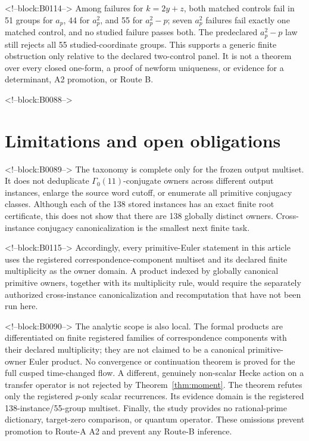 \documentclass[11pt]{article}
\theoremstyle{definition}
\theoremstyle{remark}
\newcommand{\G}{\Gamma_0(11)}
\begin{document}
<!--block:B0114-->
Among failures for $k=2y+z$, both matched controls fail in 51 groups for $a_p$, 44 for $a_p^2$, and 55 for $a_p^2-p$; seven $a_p^2$ failures fail exactly one matched control, and no studied failure passes both. The predeclared $a_p^2-p$ law still rejects all 55 studied-coordinate groups. This supports a generic finite obstruction only relative to the declared two-control panel. It is not a theorem over every closed one-form, a proof of newform uniqueness, or evidence for a determinant, A2 promotion, or Route B.

<!--block:B0088-->
\section{Limitations and open obligations}

<!--block:B0089-->
The taxonomy is complete only for the frozen output multiset. It does not deduplicate $\G$-conjugate owners across different output instances, enlarge the source word cutoff, or enumerate all primitive conjugacy classes. Although each of the 138 stored instances has an exact finite root certificate, this does not show that there are 138 globally distinct owners. Cross-instance conjugacy canonicalization is the smallest next finite task.

<!--block:B0115-->
Accordingly, every primitive-Euler statement in this article uses the registered correspondence-component multiset and its declared finite multiplicity as the owner domain. A product indexed by globally canonical primitive owners, together with its multiplicity rule, would require the separately authorized cross-instance canonicalization and recomputation that have not been run here.

<!--block:B0090-->
The analytic scope is also local. The formal products are differentiated on finite registered families of correspondence components with their declared multiplicity; they are not claimed to be a canonical primitive-owner Euler product. No convergence or continuation theorem is proved for the full cusped time-changed flow. A different, genuinely non-scalar Hecke action on a transfer operator is not rejected by Theorem~\ref{thm:moment}. The theorem refutes only the registered $p$-only scalar recurrences. Its evidence domain is the registered 138-instance/55-group multiset. Finally, the study provides no rational-prime dictionary, target-zero comparison, or quantum operator. These omissions prevent promotion to Route-A A2 and prevent any Route-B inference.
\end{document}
